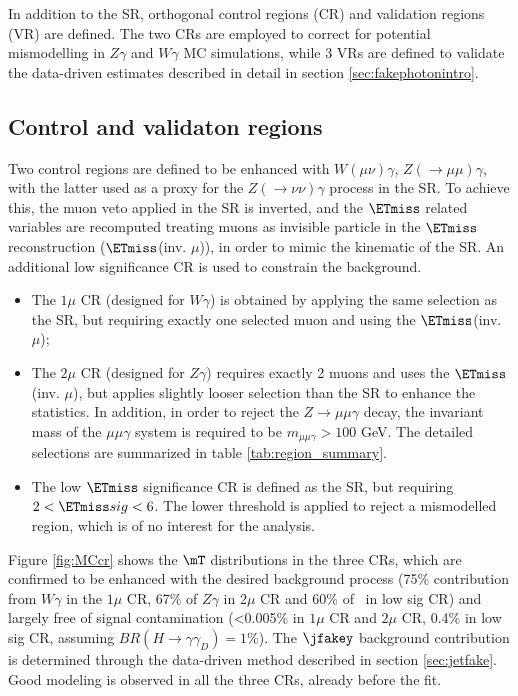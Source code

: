 In addition to the SR, orthogonal control regions (CR) and validation regions (VR) are defined. The two CRs are employed to correct for potential mismodelling in $Z\gamma$ and $W\gamma$ MC simulations, while 3 VRs are defined to validate the data-driven estimates described in detail in section \ref{sec:fakephotonintro}. 

\subsection{Control and validaton regions}
\label{sec:CR}
Two control regions are defined to be enhanced with $W(\mu\nu)\gamma$, $Z(\to\mu\mu)\gamma$, with the latter used as a proxy for the $Z(\to\nu\nu)\gamma$ process in the SR.
To achieve this, the muon veto applied in the SR is inverted, and the $\ETmiss$ related variables are recomputed treating muons as invisible particle in the $\ETmiss$ reconstruction ($\ETmiss$(inv. $\mu$)), in order to mimic the kinematic of the SR. 
An additional low \ETmiss significance CR is used to constrain the \jfakey background.
\begin{itemize}
    \item The $1\mu$ CR (designed for $W\gamma$) is obtained by applying the same selection as the SR, but requiring exactly one selected muon and using the $\ETmiss$(inv. $\mu$);
    \item The $2\mu$ CR (designed for $Z\gamma$) requires exactly 2 muons and uses the $\ETmiss$(inv. $\mu$), but applies slightly looser selection than the SR to enhance the statistics. In addition, in order to reject the $Z\to\mu\mu\gamma$ decay, the invariant mass of the $\mu\mu\gamma$ system is required to be $m_{\mu\mu\gamma}>100$ GeV. The detailed selections are summarized in table \ref{tab:region_summary}.
    \item The low $\ETmiss$ significance CR is defined as the SR, but requiring $2 < \ETmiss sig < 6$. The lower threshold is applied to reject a mismodelled region, which is of no interest for the analysis.
\end{itemize}

Figure \ref{fig:MCcr} 
shows the $\mT$ distributions in the three CRs, which are confirmed to be enhanced with the desired background process (75\% contribution from $W\gamma$ in the $1\mu$ CR, 67\% of $Z\gamma$ in $2\mu$ CR and 60\% of \jfakey\ in low \ETmiss sig CR) and largely free of signal contamination (<0.005\% in $1\mu$ CR and $2\mu$ CR, 0.4\% in low \ETmiss sig CR, assuming $BR(H\to\gamma\gamma_D)=1\%$). The $\jfakey$ background contribution is determined through the data-driven method described in section \ref{sec:jetfake}. Good modeling is observed in all the three CRs, already before the fit. 

